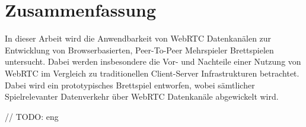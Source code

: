 \chapter*{Zusammenfassung}

In dieser Arbeit wird die Anwendbarkeit von WebRTC Datenkanälen zur Entwicklung von Browserbasierten, Peer-To-Peer Mehrspieler Brettspielen untersucht. Dabei werden insbesondere die Vor- und Nachteile einer Nutzung von WebRTC im Vergleich zu traditionellen Client-Server Infrastrukturen betrachtet. Dabei wird ein prototypisches Brettspiel entworfen, wobei sämtlicher Spielrelevanter Datenverkehr über WebRTC Datenkanäle abgewickelt wird.\par 
// TODO: eng